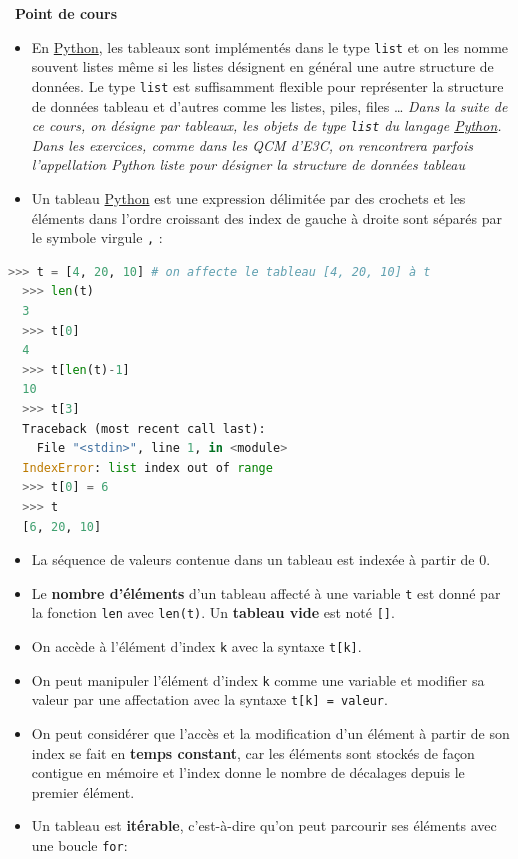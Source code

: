 \documentclass[
  11pt,
]{article}
\newcommand{\passthrough}[1]{#1}
\providecommand{\tightlist}{%
  \setlength{\itemsep}{0pt}\setlength{\parskip}{0pt}}
\newcounter{cours}
\newenvironment{cours}[1]
{\par \medskip   \addtocounter{cours}{1} \noindent  
\begin{bclogo}[arrondi =0.1,  ombre = true, barre=none, logo=\bcbook, marge=4]{~\textbf{Point de cours} \textbf{\thecours} {\itshape #1} }  \par}
{
\end{bclogo}
 \par \bigskip }
\begin{document}
\begin{cours}{}

\begin{itemize}
\tightlist
\item
  En
  \href{https://docs.python.org/3/tutorial/datastructures.html}{Python},
  les tableaux sont implémentés dans le type
  \passthrough{\lstinline!list!} et on les nomme souvent listes même si
  les listes désignent en général une autre structure de données. Le
  type \passthrough{\lstinline!list!} est suffisamment flexible pour
  représenter la structure de données tableau et d'autres comme les
  listes, piles, files \ldots{} \emph{Dans la suite de ce cours, on
  désigne par tableaux, les objets de type
  \passthrough{\lstinline!list!} du langage
  \href{https://docs.python.org/3/tutorial/datastructures.html}{Python}.
  Dans les exercices, comme dans les QCM d'E3C, on rencontrera parfois
  l'appellation Python liste pour désigner la structure de données
  tableau}
\item
  Un tableau
  \href{https://docs.python.org/3/tutorial/datastructures.html}{Python}
  est une expression délimitée par des crochets et les éléments dans
  l'ordre croissant des index de gauche à droite sont séparés par le
  symbole virgule \passthrough{\lstinline!,!} :
\end{itemize}

\begin{lstlisting}[language=Python]
  >>> t = [4, 20, 10] # on affecte le tableau [4, 20, 10] à t
  >>> len(t)
  3
  >>> t[0]
  4
  >>> t[len(t)-1]
  10
  >>> t[3]
  Traceback (most recent call last):
    File "<stdin>", line 1, in <module>
  IndexError: list index out of range   
  >>> t[0] = 6
  >>> t
  [6, 20, 10]
\end{lstlisting}

\begin{itemize}
\tightlist
\item
  La séquence de valeurs contenue dans un tableau est indexée à partir
  de 0.
\item
  Le \textbf{nombre d'éléments} d'un tableau affecté à une variable
  \passthrough{\lstinline!t!} est donné par la fonction
  \passthrough{\lstinline!len!} avec \passthrough{\lstinline!len(t)!}.
  Un \textbf{tableau vide} est noté \passthrough{\lstinline![]!}.
\item
  On accède à l'élément d'index \passthrough{\lstinline!k!} avec la
  syntaxe \passthrough{\lstinline!t[k]!}.
\item
  On peut manipuler l'élément d'index \passthrough{\lstinline!k!} comme
  une variable et modifier sa valeur par une affectation avec la syntaxe
  \passthrough{\lstinline!t[k] = valeur!}.
\item
  On peut considérer que l'accès et la modification d'un élément à
  partir de son index se fait en \textbf{temps constant}, car les
  éléments sont stockés de façon contigue en mémoire et l'index donne le
  nombre de décalages depuis le premier élément.
\item
  Un tableau est \textbf{itérable}, c'est-à-dire qu'on peut parcourir
  ses éléments avec une boucle \passthrough{\lstinline!for!}:\\
\end{itemize}


\end{cours}
\end{document}
